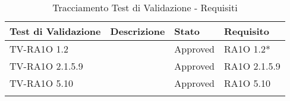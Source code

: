 
	\begin{center}
	\def\arraystretch{1.5}
	\bgroup
		\begin{longtable}{| p{3cm} | p{6cm} | p{1.5cm} | p{2cm} | }
		\hline 
		 \textbf{Test di Validazione} & \textbf{Descrizione} & \textbf{Stato} & \textbf{Requisito} \\ \hline
				TV-RA1O 1.2 & 
				 & Approved & RA1O 1.2* \newline  \\ \hline 
				TV-RA1O 2.1.5.9 & 
				 & Approved & RA1O 2.1.5.9\newline  \\ \hline 
				TV-RA1O 5.10 & 
				 & Approved & RA1O 5.10\newline  \\ \hline 
		\caption{Tracciamento Test di Validazione - Requisiti}
		\end{longtable}
	 \egroup
\end{center}